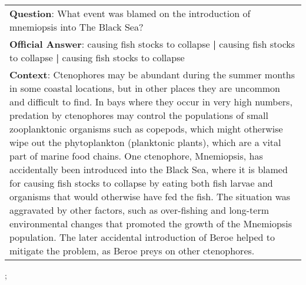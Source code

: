 \begin{figure*}[ht]
{\begin{tabular}{p{}}
            \textbf{Question}: What event was blamed on the introduction of mnemiopsis into The Black Sea?                                                                                                                                                                                                                                                                                                                                                                                                                                                                                                                                                                                                                                                                                                                                                                                                                                                    \\
            \textbf{Official Answer}: causing fish stocks to collapse \textbf{|} causing fish stocks to collapse \textbf{|} causing fish stocks to collapse                                                                                                                                                                                                                                                                                                                                                                                                                                                                                                                                                                                                                                                                                                                                                                                                   \\
            \textbf{Context}: Ctenophores may be abundant during the summer months in some coastal locations, but in other places they are uncommon and difficult to find. In bays where they occur in very high numbers, predation by ctenophores may control the populations of small zooplanktonic organisms such as copepods, which might otherwise wipe out the phytoplankton (planktonic plants), which are a vital part of marine food chains. One ctenophore, Mnemiopsis, has accidentally been introduced into the Black Sea, where it is blamed for causing fish stocks to collapse by eating both fish larvae and organisms that would otherwise have fed the fish. The situation was aggravated by other factors, such as over-fishing and long-term environmental changes that promoted the growth of the Mnemiopsis population. The later accidental introduction of Beroe helped to mitigate the problem, as Beroe preys on other ctenophores. \\
        \end{tabular}
    };
    \label{fig:ex-5726431d271a42140099d7f8}
\end{figure*}


